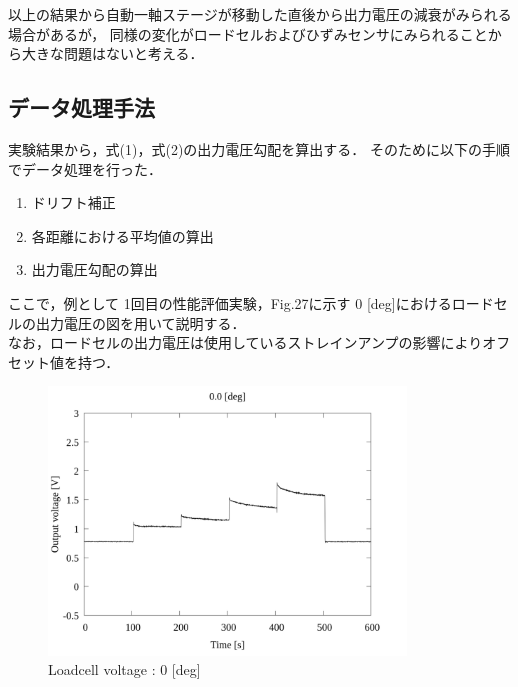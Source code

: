 
\newpage

以上の結果から自動一軸ステージが移動した直後から出力電圧の減衰がみられる場合があるが，
同様の変化がロードセルおよびひずみセンサにみられることから大きな問題はないと考える．

\subsection{データ処理手法}

実験結果から，式(1)，式(2)の出力電圧勾配を算出する．
そのために以下の手順でデータ処理を行った．

\begin{enumerate}[(1)]
  \item ドリフト補正
  \item 各距離における平均値の算出
  \item 出力電圧勾配の算出
\end{enumerate}

ここで，例として 1回目の性能評価実験，Fig.27に示す 0 [deg]におけるロードセルの出力電圧の図を用いて説明する．\\
なお，ロードセルの出力電圧は使用しているストレインアンプの影響によりオフセット値を持つ．

\begin{figure}[htbp]
  \footnotesize
  \begin{center}
    \includegraphics[width=95mm]{../../02_workspace/result/2-1/plot/01-1_loadcell/01_loadcell_0.png}
    \caption{Loadcell voltage : 0 [deg]}
  \end{center}
\end{figure}


